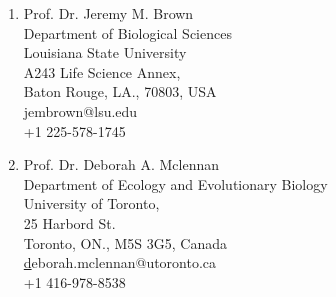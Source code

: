 \documentclass[11pt]{article}
\begin{document}
\begin{enumerate}
\item Prof. Dr. Jeremy M. Brown\\ Department of Biological Sciences\\Louisiana State University\\ A243 Life Science Annex,\\ Baton Rouge, LA., 70803, USA\\\href{jembrown@lsu.edu}jembrown@lsu.edu\\ +1 225-578-1745
\\

\item Prof. Dr. Deborah A. Mclennan\\Department of Ecology and Evolutionary Biology\\University of Toronto,\\25 Harbord St.\\Toronto, ON., M5S 3G5, Canada \\\href{deborah.mclennan@utoronto.ca}deborah.mclennan@utoronto.ca\\+1 416-978-8538
\end{enumerate}
\end{document}
